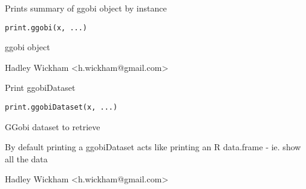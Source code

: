 \documentclass{article}
\begin{document}
\begin{Description}\relax
Prints summary of ggobi object by instance
\end{Description}
\begin{Usage}
\begin{verbatim}print.ggobi(x, ...)\end{verbatim}
\end{Usage}
\begin{Arguments}
\begin{ldescription}
\item[\code{x}] ggobi object
\item[\code{...}] 
\end{ldescription}
\end{Arguments}
\begin{Details}\relax
\end{Details}
\begin{Author}\relax
Hadley Wickham <h.wickham@gmail.com>
\end{Author}
\begin{SeeAlso}\relax
{}
\end{SeeAlso}
\begin{Examples}
\begin{ExampleCode}\end{ExampleCode}
\end{Examples}

\begin{Description}\relax
Print ggobiDataset
\end{Description}
\begin{Usage}
\begin{verbatim}print.ggobiDataset(x, ...)\end{verbatim}
\end{Usage}
\begin{Arguments}
\begin{ldescription}
\item[\code{x}] GGobi dataset to retrieve
\item[\code{...}] 
\end{ldescription}
\end{Arguments}
\begin{Details}\relax
By default printing a ggobiDataset acts like
printing an R data.frame - ie. show all the data
\end{Details}
\begin{Author}\relax
Hadley Wickham <h.wickham@gmail.com>
\end{Author}
\begin{Examples}
\begin{ExampleCode}\end{ExampleCode}
\end{Examples}
\end{document}
